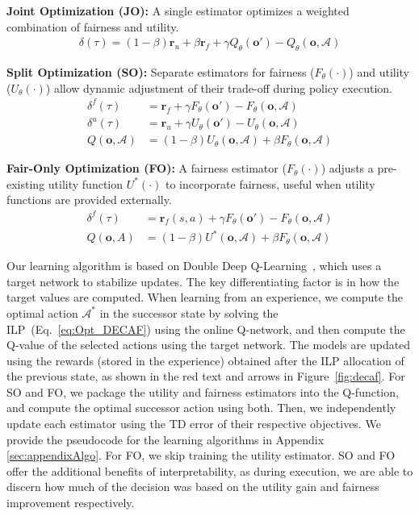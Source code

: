 \squishlist
    \item \textbf{Joint Optimization (JO):} A single estimator optimizes a weighted combination of fairness and utility.
    \begin{align}
    \delta(\tau) = (1-\beta) \mathbf{r}_u + \beta  \mathbf{r}_f + \gamma Q_\theta(\mathbf{o}') - Q_\theta(\mathbf{o}, \mathcal{A}) \label{eq:JO}
\end{align}
    \item \textbf{Split Optimization (SO):} Separate estimators for fairness ($F_\theta(\cdot)$) and utility ($U_\theta(\cdot)$) allow dynamic adjustment of their trade-off during policy execution.
    \begin{align}
    \delta^f(\tau) &= \mathbf{r}_f + \gamma F_\theta(\mathbf{o}') - F_\theta(\mathbf{o}, \mathcal{A}) \\
    \delta^u(\tau) &= \mathbf{r}_u + \gamma U_\theta(\mathbf{o}') - U_\theta(\mathbf{o}, \mathcal{A}) \\
    Q(\mathbf{o}, \mathcal{A}) &= (1-\beta) U_\theta(\mathbf{o}, \mathcal{A}) + \beta F_\theta(\mathbf{o}, \mathcal{A}) \label{eq:SO}
\end{align}
    \item \textbf{Fair-Only Optimization (FO):} A fairness estimator ($F_\theta(\cdot)$) adjusts a pre-existing utility function $U^*(\cdot)$ to incorporate fairness, useful when utility functions are provided externally.
    \begin{align}
    \delta^f(\tau) &= \mathbf{r}_f(s,a) + \gamma F_\theta(\mathbf{o}') - F_\theta(\mathbf{o}, \mathcal{A}) \\
    Q(\mathbf{o}, A) &= (1-\beta) U^*(\mathbf{o}, \mathcal{A}) + \beta F_\theta(\mathbf{o}, \mathcal{A}) \label{eq:FO}
\end{align}
\squishend


Our learning algorithm is based on Double Deep Q-Learning~\cite{van2016DDQN}, which uses a target network to stabilize updates. The key differentiating factor is in how the target values are computed. When learning from an experience, we compute the optimal action $\mathcal{A}^*$ in the successor state by solving the ILP~(Eq.~\ref{eq:Opt_DECAF}) using the online Q-network, and then compute the Q-value of the selected actions using the target network. The models are updated using the rewards (stored in the experience) obtained after the ILP allocation of the previous state, as shown in the red text and arrows in Figure~\ref{fig:decaf}. 
For SO and FO, we package the utility and fairness estimators into the Q-function, and compute the optimal successor action using both. Then, we independently update each estimator using the TD error of their respective objectives. We provide the pseudocode for the learning algorithms in Appendix \ref{sec:appendixAlgo}.
For FO, we skip training the utility estimator.
SO and FO offer the additional benefits of interpretability, as during execution, we are able to discern how much of the decision was based on the utility gain and fairness improvement respectively.

